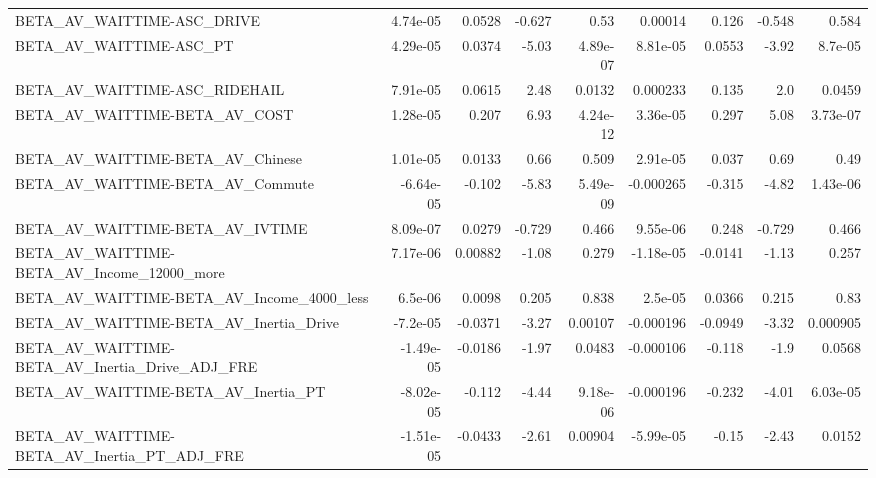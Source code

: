 \begin{tabular}{lrrrrrrrr}
BETA\_AV\_WAITTIME-ASC\_DRIVE                         &    4.74e-05 &       0.0528 &   -0.627 &     0.53 &    0.00014 &       0.126 &       -0.548 &         0.584 \\
BETA\_AV\_WAITTIME-ASC\_PT                            &    4.29e-05 &       0.0374 &    -5.03 & 4.89e-07 &   8.81e-05 &      0.0553 &        -3.92 &       8.7e-05 \\
BETA\_AV\_WAITTIME-ASC\_RIDEHAIL                      &    7.91e-05 &       0.0615 &     2.48 &   0.0132 &   0.000233 &       0.135 &          2.0 &        0.0459 \\
BETA\_AV\_WAITTIME-BETA\_AV\_COST                      &    1.28e-05 &        0.207 &     6.93 & 4.24e-12 &   3.36e-05 &       0.297 &         5.08 &      3.73e-07 \\
BETA\_AV\_WAITTIME-BETA\_AV\_Chinese                   &    1.01e-05 &       0.0133 &     0.66 &    0.509 &   2.91e-05 &       0.037 &         0.69 &          0.49 \\
BETA\_AV\_WAITTIME-BETA\_AV\_Commute                   &   -6.64e-05 &       -0.102 &    -5.83 & 5.49e-09 &  -0.000265 &      -0.315 &        -4.82 &      1.43e-06 \\
BETA\_AV\_WAITTIME-BETA\_AV\_IVTIME                    &    8.09e-07 &       0.0279 &   -0.729 &    0.466 &   9.55e-06 &       0.248 &       -0.729 &         0.466 \\
BETA\_AV\_WAITTIME-BETA\_AV\_Income\_12000\_more         &    7.17e-06 &      0.00882 &    -1.08 &    0.279 &  -1.18e-05 &     -0.0141 &        -1.13 &         0.257 \\
BETA\_AV\_WAITTIME-BETA\_AV\_Income\_4000\_less          &     6.5e-06 &       0.0098 &    0.205 &    0.838 &    2.5e-05 &      0.0366 &        0.215 &          0.83 \\
BETA\_AV\_WAITTIME-BETA\_AV\_Inertia\_Drive             &    -7.2e-05 &      -0.0371 &    -3.27 &  0.00107 &  -0.000196 &     -0.0949 &        -3.32 &      0.000905 \\
BETA\_AV\_WAITTIME-BETA\_AV\_Inertia\_Drive\_ADJ\_FRE     &   -1.49e-05 &      -0.0186 &    -1.97 &   0.0483 &  -0.000106 &      -0.118 &         -1.9 &        0.0568 \\
BETA\_AV\_WAITTIME-BETA\_AV\_Inertia\_PT                &   -8.02e-05 &       -0.112 &    -4.44 & 9.18e-06 &  -0.000196 &      -0.232 &        -4.01 &      6.03e-05 \\
BETA\_AV\_WAITTIME-BETA\_AV\_Inertia\_PT\_ADJ\_FRE        &   -1.51e-05 &      -0.0433 &    -2.61 &  0.00904 &  -5.99e-05 &       -0.15 &        -2.43 &        0.0152 \\

\end{tabular}
